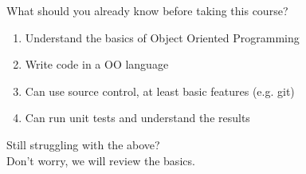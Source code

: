 \begin{frame}[fragile]{What should you already know before taking this course?}
    \begin{enumerate}
        \item Understand the basics of Object Oriented Programming
        \item Write code in a OO language
        \item Can use source control, at least basic features (e.g. git)
        \item Can run unit tests and understand the results
    \end{enumerate}

    \pause
    \vspace{1em}
    \begin{tcolorbox}[highlight]
    Still struggling with the above? \\
    Don't worry, we will review the basics.      
    \end{tcolorbox}
    
\end{frame}